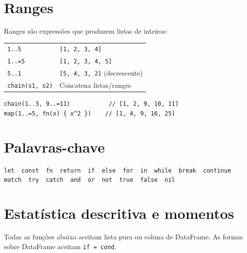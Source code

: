 \section{Ranges}

Ranges são expressões que produzem listas de inteiros:

\begin{center}
\begin{tabular}{ll}
\toprule
\texttt{1..5}          & \texttt{[1, 2, 3, 4]} \\
\texttt{1..=5}         & \texttt{[1, 2, 3, 4, 5]} \\
\texttt{5..1}          & \texttt{[5, 4, 3, 2]} (decrescente) \\
\texttt{chain(s1, s2)} & Concatena listas/ranges \\
\bottomrule
\end{tabular}
\end{center}

\begin{lstlisting}[style=inline]
chain(1..3, 9..=11)           // [1, 2, 9, 10, 11]
map(1..=5, fn(x) { x^2 })    // [1, 4, 9, 16, 25]
\end{lstlisting}

\section{Palavras-chave}

\begin{lstlisting}[style=inline]
let  const  fn  return  if  else  for  in  while  break  continue
match  try  catch  and  or  not  true  false  nil
\end{lstlisting}

\section{Estatística descritiva e momentos}

Todas as funções abaixo aceitam lista pura ou coluna de DataFrame.
As formas sobre DataFrame aceitam \lstinline{if = cond}.

